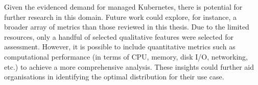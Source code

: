 Given the evidenced demand for managed Kubernetes, there is potential for further research in this domain. Future work could explore, for instance, a broader array of metrics than those reviewed in this thesis. Due to the limited resources, only a handful of selected qualitative features were selected for assessment. However, it is possible to include quantitative metrics such as computational performance (in terms of CPU, memory, disk I/O, networking, etc.) to achieve a more comprehensive analysis. These insights could further aid organisations in identifying the optimal distribution for their use case.






















